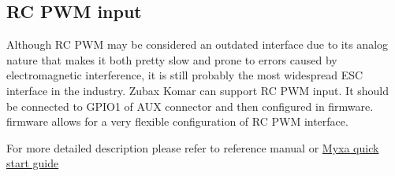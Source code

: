 \subsection{RC PWM input}
Although RC PWM may be considered an outdated interface due to its analog nature that makes it both pretty slow
and prone to errors caused by electromagnetic interference, it is still probably the most widespread
ESC interface in the industry. Zubax Komar can support RC PWM input.
It should be connected to GPIO1 of AUX connector and then configured in firmware.
 firmware allows for a very flexible configuration of RC PWM interface.

For more detailed description please refer to  reference manual or
\href{https://forum.zubax.com/t/quick-start-guide-for-myxa-v0-1/911}{Myxa quick start guide}